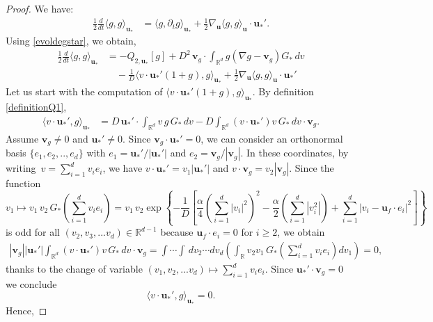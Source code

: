 \documentclass[10pt,a4paper]{amsart}
\begin{document}
\begin{proof}
We have:
\begin{equation*}
\begin{split}
    \frac{1}{2}\frac{d}{dt}\langle g, g \rangle_{\mathbf{u}_*}
    &= \langle g, \partial_t g \rangle_{\mathbf{u}_*}
    + \frac{1}{2} \nabla_\mathbf{u} \langle g, g \rangle_\mathbf{u} \cdot \mathbf{u}_*'.
\end{split}
\end{equation*}
Using \eqref{evoldegstar}, we obtain,
\begin{equation}
\label{bigequa}
\begin{split}
    \frac{1}{2} \frac{d}{dt} \langle g, g \rangle_{\mathbf{u}_*}
    &= -Q_{2,\mathbf{u}_*}[g] 
    + D^2\, \mathbf{v}_g \cdot \int_{\mathbb{R}^d} g(\nabla g - \mathbf{v}_g) G_*\,dv \\
    &\quad - \frac{1}{D} \langle v \cdot \mathbf{u}_*'(1+g), g \rangle_{\mathbf{u}_*}
    + \frac{1}{2} \nabla_\mathbf{u} \langle g, g \rangle_\mathbf{u} \cdot \mathbf{u}_*'
\end{split}
\end{equation}
Let us start with the computation of $\langle v\cdot \mathbf{u}_*'(1+g),g\rangle_{\mathbf{u}_*}$.
By definition \eqref{definitionQ1},  
\begin{align*}
    \langle v\cdot \mathbf{u}_*',g\rangle_{\mathbf{u}_*}&=D\, \mathbf{u}_*'\cdot \int_{\mathbb{R}^d} v \, g\,G_{*}\,dv- D\int_{\mathbb{R}^d}(v\cdot \mathbf{u}_*') v  \,G_{*}\,dv \cdot \mathbf{v}_g.
\end{align*}
Assume $\mathbf{v}_g\neq 0$ and $\mathbf{u}_*'\neq0$. Since $\mathbf{v}_g \cdot \mathbf{u}_*'=0$, we can consider an orthonormal basis $\{e_1,e_2,..,e_d\}$ with $e_1=\mathbf{u}_*'/|\mathbf{u}_*'|$ and $e_2=\mathbf{v}_g/|\mathbf{v}_g|$. In these coordinates, by writing~$v=\sum_{i=1}^d v_ie_i$, we have $v\cdot \mathbf{u}_*'=v_1 |\mathbf{u}_*'|$ and $v\cdot \mathbf{v}_g=v_2|\mathbf{v}_g|$. Since the function $$v_1\mapsto v_1 \,v_2 \,G_{*} \left(\sum_{i=1}^dv_ie_i\right)=  v_1 \,v_2 \exp \left\{-\frac{1}{D}\left[\frac{\alpha }{4} \left(\sum_{i=1}^d|v_i|^2 \right)^2-\frac{\alpha}{2}\left( \sum_{i=1}^d |v_i^2|\right)+ \sum_{i=1}^d |v_i-\mathbf{u}_{f}\cdot e_i|^2\right] \right\}$$ is odd for all $(v_2,v_3,...v_d) \in \mathbb{R}^{d-1}$ because $\mathbf{u}_{f}\cdot e_i=0$ for $i\geq 2$, we obtain 
\begin{align*}
    |\mathbf{v}_g||\mathbf{u}_*'|\int_{\mathbb{R}^d}(v\cdot \mathbf{u}_*') v  \,G_{*}\,dv \cdot \mathbf{v}_g=\int \cdots \int  \, dv_2 \cdots dv_d
\left(\int_{\mathbb{R}}v_2 v_1  \,G_{*} \left(\sum_{i=1}^dv_ie_i\right)dv_1\right)=0,
\end{align*}
thanks to the change of variable $(v_1,v_2,...v_d)\mapsto \sum_{i=1}^dv_ie_i$.
Since $\mathbf{u}_*'\cdot \mathbf{v}_g=0$ we conclude 
$$\langle v\cdot \mathbf{u}_*',g\rangle_{\mathbf{u}_*}=0.$$
Hence, 


\end{proof}
\end{document}
